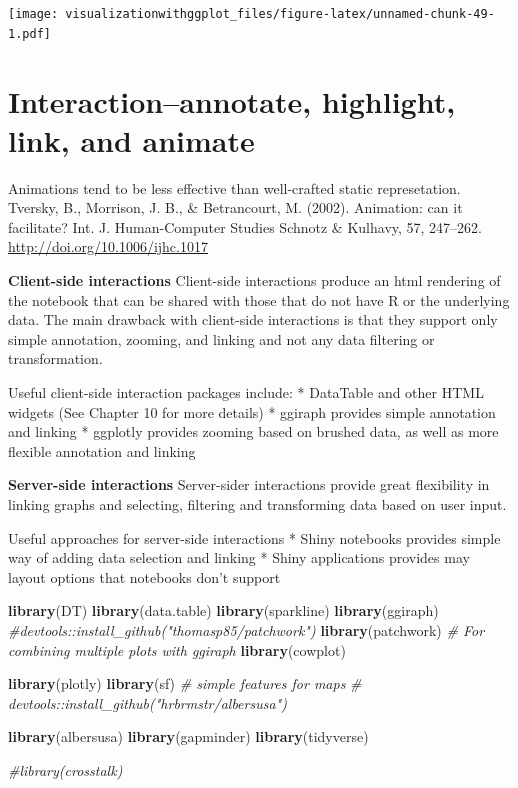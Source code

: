 \documentclass[]{krantz}
\makeatletter
\newenvironment{Shaded}{\begin{snugshade}}{\end{snugshade}}
\newcommand{\CommentTok}[1]{\textcolor[rgb]{0.56,0.35,0.01}{\textit{#1}}}
\newcommand{\KeywordTok}[1]{\textcolor[rgb]{0.13,0.29,0.53}{\textbf{#1}}}
\newcommand{\NormalTok}[1]{#1}
\newenvironment{kframe}{%
\medskip{}
\setlength{\fboxsep}{.8em}
 \def\at@end@of@kframe{}%
 \ifinner\ifhmode%
  \def\at@end@of@kframe{\end{minipage}}%
  \begin{minipage}{\columnwidth}%
 \fi\fi%
 \def\FrameCommand##1{\hskip\@totalleftmargin \hskip-\fboxsep
 \colorbox{shadecolor}{##1}\hskip-\fboxsep
     \hskip-\linewidth \hskip-\@totalleftmargin \hskip\columnwidth}%
 \MakeFramed {\advance\hsize-\width
   \@totalleftmargin\z@ \linewidth\hsize
   \@setminipage}}%
 {\par\unskip\endMakeFramed%
 \at@end@of@kframe}
\renewenvironment{Shaded}{\begin{kframe}}{\end{kframe}}
\makeatother
\begin{document}
\texttt{[image: visualizationwithggplot\_files/figure-latex/unnamed-chunk-49-1.pdf]}

\cleardoublepage

\hypertarget{Interaction}{%
\chapter{Interaction--annotate, highlight, link, and animate}\label{Interaction}}

Animations tend to be less effective than well-crafted static represetation.
Tversky, B., Morrison, J. B., \& Betrancourt, M. (2002). Animation: can it facilitate? Int. J. Human-Computer Studies Schnotz \& Kulhavy, 57, 247--262. \url{http://doi.org/10.1006/ijhc.1017}

\textbf{Client-side interactions}
Client-side interactions produce an html rendering of the notebook that can be shared with those that do not have R or the underlying data. The main drawback with client-side interactions is that they support only simple annotation, zooming, and linking and not any data filtering or transformation.

Useful client-side interaction packages include:
* DataTable and other HTML widgets (See Chapter 10 for more details)
* ggiraph provides simple annotation and linking
* ggplotly provides zooming based on brushed data, as well as more flexible annotation and linking

\textbf{Server-side interactions}
Server-sider interactions provide great flexibility in linking graphs and selecting, filtering and transforming data based on user input.

Useful approaches for server-side interactions
* Shiny notebooks provides simple way of adding data selection and linking
* Shiny applications provides may layout options that notebooks don't support

\begin{Shaded}
\begin{Highlighting}[]
\KeywordTok{library}\NormalTok{(DT)}
\KeywordTok{library}\NormalTok{(data.table)}
\KeywordTok{library}\NormalTok{(sparkline)}
\KeywordTok{library}\NormalTok{(ggiraph)}
\CommentTok{#devtools::install_github("thomasp85/patchwork")}
\KeywordTok{library}\NormalTok{(patchwork) }\CommentTok{# For combining multiple plots with ggiraph}
\KeywordTok{library}\NormalTok{(cowplot)}

\KeywordTok{library}\NormalTok{(plotly)}
\KeywordTok{library}\NormalTok{(sf) }\CommentTok{# simple features for maps}
\CommentTok{# devtools::install_github("hrbrmstr/albersusa")}

\KeywordTok{library}\NormalTok{(albersusa)}
\KeywordTok{library}\NormalTok{(gapminder)}
\KeywordTok{library}\NormalTok{(tidyverse)}

\CommentTok{#library(crosstalk)}
\end{Highlighting}
\end{Shaded}
\end{document}
